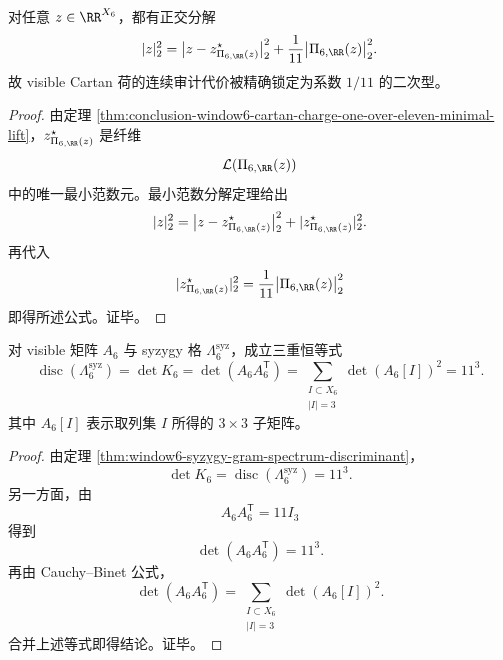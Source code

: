 \begin{corollary}\label{cor:conclusion-window6-cartan-charge-orthogonal-energy-splitting}
对任意 \(z\in\RR^{X_6}\)，都有正交分解
\[
|z|_2^2
=
\bigl|z-z_{\Pi_{6,\RR}(z)}^\star\bigr|_2^2
+\frac{1}{11}\bigl|\Pi_{6,\RR}(z)\bigr|_2^2.
\]
故 visible Cartan 荷的连续审计代价被精确锁定为系数 \(1/11\) 的二次型。
\end{corollary}
\begin{proof}
由定理 \ref{thm:conclusion-window6-cartan-charge-one-over-eleven-minimal-lift}，\(z_{\Pi_{6,\RR}(z)}^\star\) 是纤维
\[
\mathcal L(\Pi_{6,\RR}(z))
\]
中的唯一最小范数元。最小范数分解定理给出
\[
|z|_2^2=\bigl|z-z_{\Pi_{6,\RR}(z)}^\star\bigr|_2^2+|z_{\Pi_{6,\RR}(z)}^\star|_2^2.
\]
再代入
\[
|z_{\Pi_{6,\RR}(z)}^\star|_2^2=\frac{1}{11}\bigl|\Pi_{6,\RR}(z)\bigr|_2^2
\]
即得所述公式。证毕。
\end{proof}

\begin{theorem}\label{thm:conclusion-window6-syzygy-discriminant-volume-budget-holography}
对 visible 矩阵 \(A_6\) 与 syzygy 格 \(\Lambda_6^{\mathrm{syz}}\)，成立三重恒等式
\[
\operatorname{disc}(\Lambda_6^{\mathrm{syz}})
=
\det K_6
=
\det(A_6A_6^{\mathsf T})
=
\sum_{\substack{I\subset X_6\\ |I|=3}}\det(A_6[I])^2
=
11^3.
\]
其中 \(A_6[I]\) 表示取列集 \(I\) 所得的 \(3\times 3\) 子矩阵。
\end{theorem}
\begin{proof}
由定理 \ref{thm:window6-syzygy-gram-spectrum-discriminant}，
\[
\det K_6=\operatorname{disc}(\Lambda_6^{\mathrm{syz}})=11^3.
\]
另一方面，由
\[
A_6A_6^{\mathsf T}=11I_3
\]
得到
\[
\det(A_6A_6^{\mathsf T})=11^3.
\]
再由 Cauchy--Binet 公式，
\[
\det(A_6A_6^{\mathsf T})
=
\sum_{\substack{I\subset X_6\\ |I|=3}}\det(A_6[I])^2.
\]
合并上述等式即得结论。证毕。
\end{proof}

